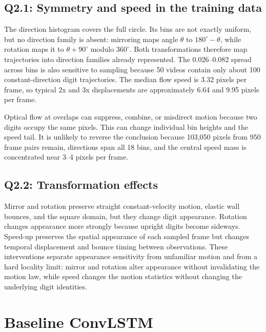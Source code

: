 \documentclass{article}
\begin{document}
\subsection*{Q2.1: Symmetry and speed in the training data}

The direction histogram covers the full circle. Its bins are not exactly uniform, but no direction family is absent: mirroring maps angle $\theta$ to $180^\circ-\theta$, while rotation maps it to $\theta+90^\circ$ modulo $360^\circ$. Both transformations therefore map trajectories into direction families already represented. The 0.026--0.082 spread across bins is also sensitive to sampling because 50 videos contain only about 100 constant-direction digit trajectories. The median flow speed is 3.32 pixels per frame, so typical 2x and 3x displacements are approximately 6.64 and 9.95 pixels per frame.

Optical flow at overlaps can suppress, combine, or misdirect motion because two digits occupy the same pixels. This can change individual bin heights and the speed tail. It is unlikely to reverse the conclusion because 103,050 pixels from 950 frame pairs remain, directions span all 18 bins, and the central speed mass is concentrated near 3--4 pixels per frame.

\subsection*{Q2.2: Transformation effects}

Mirror and rotation preserve straight constant-velocity motion, elastic wall bounces, and the square domain, but they change digit appearance. Rotation changes appearance more strongly because upright digits become sideways. Speed-up preserves the spatial appearance of each sampled frame but changes temporal displacement and bounce timing between observations. These interventions separate appearance sensitivity from unfamiliar motion and from a hard locality limit: mirror and rotation alter appearance without invalidating the motion law, while speed changes the motion statistics without changing the underlying digit identities.

\section{Baseline ConvLSTM}
\label{sec:q2-baseline}
\end{document}
